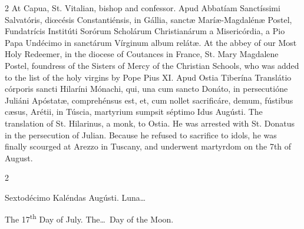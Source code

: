 \begin{paracol}{2}
\switchcolumn
{}
At Capua, St. Vitalian, bishop and 
 confessor.
\switchcolumn*
{}
Apud Abbatíam 
 Sanctíssimi Salvatóris, diœcésis Constantiénsis, in Gállia, sanctæ 
 Maríæ-Magdalénæ Postel, Fundatrícis Institúti Sorórum Scholárum 
 Christianárum a Misericórdia, a Pio Papa Undécimo in sanctárum Vírginum 
 album relátæ.
\switchcolumn
{}
At the abbey of our Most Holy 
 Redeemer, in the diocese of Coutances in France, St. Mary Magdalene Postel, 
 foundress of the Sisters of Mercy of the Christian Schools, who was added to 
 the list of the holy virgins by Pope Pius XI.
\switchcolumn*
{}
Apud Ostia Tiberína 
 Translátio córporis sancti Hilaríni Mónachi, qui, una cum sancto Donáto, in 
 persecutióne Juliáni Apóstatæ, comprehénsus est, et, cum nollet sacrificáre, 
 demum, fústibus cæsus, Arétii, in Túscia, martyrium sumpsit séptimo Idus 
 Augústi.
\switchcolumn
{}
The translation of St. Hilarinus, a 
 monk, to Ostia. He was arrested with St. Donatus in the persecution of 
 Julian. Because he refused to sacrifice to idols, he was finally 
 scourged at Arezzo in Tuscany, and underwent martyrdom on the 7th of August.
\switchcolumn*
{}
\end{paracol}


\begin{paracol}{2}
\begin{center}{\color{gregoriocolor} Sextodécimo Kaléndas Augústi. 
 Luna\dots\ }\end{center}
\switchcolumn
{}
\begin{center}{\color{gregoriocolor} The 
 17\textsuperscript{th} Day of 
 July. The\dots\ Day of the Moon.}\end{center}
\end{paracol}

